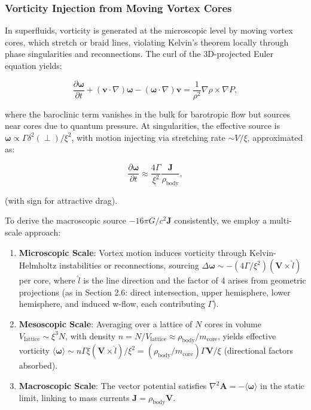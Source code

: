 \documentclass{article}
\begin{document}
\subsubsection{Vorticity Injection from Moving Vortex Cores}

In superfluids, vorticity is generated at the microscopic level by moving vortex cores, which stretch or braid lines, violating Kelvin's theorem locally through phase singularities and reconnections. The curl of the 3D-projected Euler equation yields:

\[
\frac{\partial \boldsymbol{\omega}}{\partial t} + (\mathbf{v} \cdot \nabla) \boldsymbol{\omega} - (\boldsymbol{\omega} \cdot \nabla) \mathbf{v} = \frac{1}{\rho^2} \nabla \rho \times \nabla P,
\]

where the baroclinic term vanishes in the bulk for barotropic flow but sources near cores due to quantum pressure. At singularities, the effective source is \(\boldsymbol{\omega} \propto \Gamma \delta^2(\perp) / \xi^2\), with motion injecting via stretching rate \(\sim V / \xi\), approximated as:

\[
\frac{\partial \boldsymbol{\omega}}{\partial t} \approx \frac{4 \Gamma}{\xi^2} \frac{\mathbf{J}}{\rho_{\text{body}}},
\]

(with sign for attractive drag).

To derive the macroscopic source \(-16\pi G / c^2 \mathbf{J}\) consistently, we employ a multi-scale approach:

\begin{enumerate}
    \item \textbf{Microscopic Scale}: Vortex motion induces vorticity through Kelvin-Helmholtz instabilities or reconnections, sourcing \(\Delta \boldsymbol{\omega} \sim - (4 \Gamma / \xi^2) (\mathbf{V} \times \hat{l})\) per core, where \(\hat{l}\) is the line direction and the factor of 4 arises from geometric projections (as in Section 2.6: direct intersection, upper hemisphere, lower hemisphere, and induced w-flow, each contributing \(\Gamma\)).
    \item \textbf{Mesoscopic Scale}: Averaging over a lattice of \(N\) cores in volume \(V_{\text{lattice}} \sim \xi^3 N\), with density \(n = N / V_{\text{lattice}} \approx \rho_{\text{body}} / m_{\text{core}}\), yields effective vorticity \(\langle \boldsymbol{\omega} \rangle \sim n \Gamma \xi (\mathbf{V} \times \hat{l}) / \xi^2 = (\rho_{\text{body}} / m_{\text{core}}) \Gamma \mathbf{V} / \xi\) (directional factors absorbed).
    \item \textbf{Macroscopic Scale}: The vector potential satisfies \(\nabla^2 \mathbf{A} = - \langle \boldsymbol{\omega} \rangle\) in the static limit, linking to mass currents \(\mathbf{J} = \rho_{\text{body}} \mathbf{V}\).
\end{enumerate}
\end{document}
